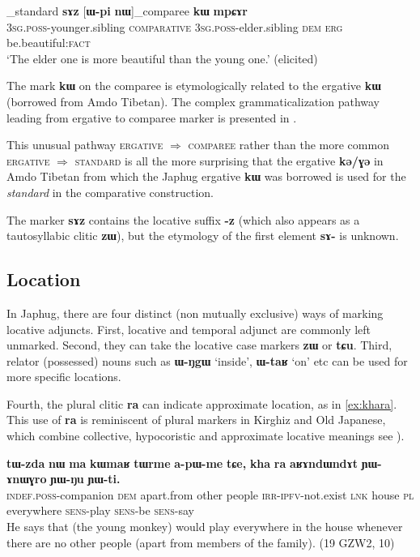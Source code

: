 \documentclass[oldfontcommands,oneside,a4paper,11pt]{article}
\newcommand{\ipa}[1]{\mbox{\phon\textbf{#1}}} %
\begin{document}
\begin{exe}
\ex \label{ex:comp1}
\gll  [\ipa{ɯ-ʁi}]_{standard}   	\ipa{sɤz}   	[\ipa{ɯ-pi}   	\ipa{nɯ}]_{comparee}   	\ipa{\textbf{kɯ}}   	\ipa{mpɕɤr}     \\
\textsc{3sg.poss}-younger.sibling \textsc{comparative} \textsc{3sg.poss}-elder.sibling \textsc{dem} \textsc{erg}  be.beautiful:\textsc{fact} \\
\glt `The elder one is more beautiful than the young one.' (elicited)
\end{exe}

The mark \ipa{kɯ} on the comparee is etymologically related to the ergative \ipa{kɯ} (borrowed from Amdo Tibetan). The complex grammaticalization pathway leading from ergative to comparee marker is presented in \citet{jacques16comparative}. 

This unusual pathway \textsc{ergative} $\Rightarrow$ \textsc{comparee} rather than the more common \textsc{ergative} $\Rightarrow$ \textsc{standard} is all the more surprising that the ergative \ipa{kə/ɣə} in Amdo Tibetan from which the Japhug ergative \ipa{kɯ} was borrowed is used for the \textit{standard} in the comparative construction.

The marker \ipa{sɤz} contains the locative suffix \ipa{-z} (which also appears as a tautosyllabic clitic \ipa{zɯ}), but the etymology of the first element \ipa{sɤ-} is unknown. 

 \subsection{Location}   \label{sec:loc}
In Japhug, there are four distinct (non mutually exclusive) ways of marking locative adjuncts. First, locative and temporal adjunct are commonly left unmarked. Second, they can  take the locative case markers \ipa{zɯ} or \ipa{tɕu}. Third, relator (possessed) nouns such as \ipa{ɯ-ŋgɯ} `inside', \ipa{ɯ-taʁ} `on' etc can be used for more specific locations. 

Fourth, the plural clitic \ipa{ra} can indicate approximate location, as in \ref{ex:khara}. This use of \ipa{ra} is reminiscent of plural markers in Kirghiz and Old Japanese, which combine collective, hypocoristic and approximate locative meanings see \citealt[195]{antonov07ra}).

\begin{exe}
\ex \label{ex:khara}
\gll
\ipa{tɯ-zda} 	\ipa{nɯ} 	\ipa{ma} 	\ipa{kɯmaʁ} 	\ipa{tɯrme} 	\ipa{a-pɯ-me} 	\ipa{tɕe,} 	\ipa{kha} 	\ipa{ra} 	\ipa{aʁɤndɯndɤt} \ipa{ɲɯ-ɤnɯɣro} 	\ipa{ɲɯ-ŋu} 	\ipa{ɲɯ-ti.} \\
\textsc{indef.poss}-companion \textsc{dem} apart.from other people \textsc{irr-ipfv}-not.exist \textsc{lnk} house \textsc{pl} everywhere \textsc{sens}-play \textsc{sens}-be \textsc{sens}-say \\
\glt He says that (the young monkey) would play everywhere in the house whenever there are no other people (apart from members of the family). (19 GZW2, 10)
\end{exe}
\end{document}

